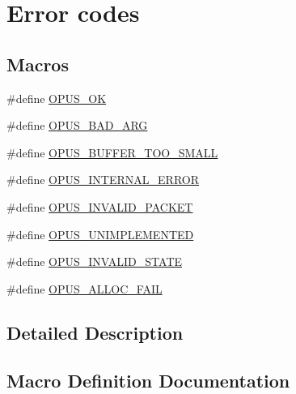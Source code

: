 \hypertarget{group__opus__errorcodes}{}\section{Error codes}
\label{group__opus__errorcodes}
\subsection*{Macros}
\begin{DoxyCompactItemize}
\item 
\#define \mbox{\hyperlink{group__opus__errorcodes_gaa44cf8a185e1b5cb940ef63eb4f02d21}{O\+P\+U\+S\+\_\+\+OK}}
\item 
\#define \mbox{\hyperlink{group__opus__errorcodes_gaf2d43e479455a1a3b6874e5faf4e827d}{O\+P\+U\+S\+\_\+\+B\+A\+D\+\_\+\+A\+RG}}
\item 
\#define \mbox{\hyperlink{group__opus__errorcodes_gacd897c05563ec04a67d8e92ba29f3d4f}{O\+P\+U\+S\+\_\+\+B\+U\+F\+F\+E\+R\+\_\+\+T\+O\+O\+\_\+\+S\+M\+A\+LL}}
\item 
\#define \mbox{\hyperlink{group__opus__errorcodes_gae1f952c366ebd380df9efa1842635a0b}{O\+P\+U\+S\+\_\+\+I\+N\+T\+E\+R\+N\+A\+L\+\_\+\+E\+R\+R\+OR}}
\item 
\#define \mbox{\hyperlink{group__opus__errorcodes_ga46fc9dd493fb8e291bd8e838f0988bb7}{O\+P\+U\+S\+\_\+\+I\+N\+V\+A\+L\+I\+D\+\_\+\+P\+A\+C\+K\+ET}}
\item 
\#define \mbox{\hyperlink{group__opus__errorcodes_ga3b8d73b0f44b8b925ff40fd7c02b14a0}{O\+P\+U\+S\+\_\+\+U\+N\+I\+M\+P\+L\+E\+M\+E\+N\+T\+ED}}
\item 
\#define \mbox{\hyperlink{group__opus__errorcodes_ga54416ec79619179d688918f25e9b20e3}{O\+P\+U\+S\+\_\+\+I\+N\+V\+A\+L\+I\+D\+\_\+\+S\+T\+A\+TE}}
\item 
\#define \mbox{\hyperlink{group__opus__errorcodes_ga92fae6b1de2ac16b8d96561f9a8fb8b9}{O\+P\+U\+S\+\_\+\+A\+L\+L\+O\+C\+\_\+\+F\+A\+IL}}
\end{DoxyCompactItemize}


\subsection{Detailed Description}


\subsection{Macro Definition Documentation}
\mbox{\label{group__opus__errorcodes_ga92fae6b1de2ac16b8d96561f9a8fb8b9}} 
